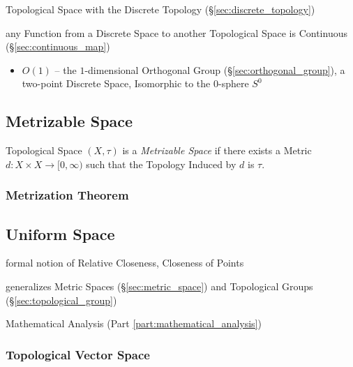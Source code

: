 Topological Space with the Discrete Topology (\S\ref{sec:discrete_topology})

any Function from a Discrete Space to another Topological Space is Continuous
(\S\ref{sec:continuous_map})

\begin{itemize}
  \item $O(1)$ -- the $1$-dimensional Orthogonal Group
    (\S\ref{sec:orthogonal_group}), a two-point Discrete Space, Isomorphic to
    the $0$-sphere $S^0$
\end{itemize}



\subsection{Metrizable Space}\label{sec:metrizable_space}

Topological Space $(X, \tau)$ is a \emph{Metrizable Space} if there
exists a Metric $d : X \times X \rightarrow [0, \infty)$ such that the
  Topology Induced by $d$ is $\tau$.



\subsubsection{Metrization Theorem}\label{sec:metrization_theorem}



\subsection{Uniform Space}\label{sec:uniform_space}

formal notion of Relative Closeness, Closeness of Points

generalizes Metric Spaces (\S\ref{sec:metric_space}) and Topological
Groups (\S\ref{sec:topological_group})

Mathematical Analysis (Part \ref{part:mathematical_analysis})



\subsubsection{Topological Vector Space}\label{sec:topological_vectorspace}

